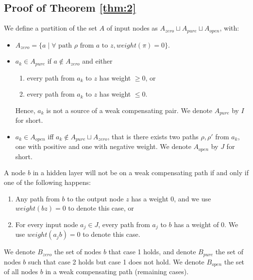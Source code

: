 			
			\subsection{Proof of Theorem \ref{thm:2}}
			
			\begin{definition}
				We define a partition of the set $A$ of input nodes as $A_{zero} \sqcup A_{pure}\sqcup A_{open}$, with:  
				\begin{itemize}
					\item $A_{zero}= \{a \mid \forall \text{ path $\rho$ from $a$ to } z, weight(\pi)=0\}$.
	
					\item $a_k \in A_{pure}$  if $a \notin A_{zero}$ and either
					\begin{enumerate}
						\item every path from $a_k$ to $z$ has weight $\geq 0$, or
						\item every path from $a_k$ to $z$ has weight $\leq 0$. 
						
					\end{enumerate}
					Hence, $a_k$ is not a source of a weak compensating pair. We denote 
					$A_{pure}$ by $I$ for short.
					\item $a_k \in A_{open}$ iff $a_k \notin A_{pure} \sqcup A_{zero}$, that is there exists two paths $\rho,\rho'$ from $a_k$, one with positive and one with negative weight. 	We denote $A_{open}$ by $J$ for short.
				\end{itemize}
			\end{definition} 
			

			
			\begin{lemma} \label{lem:open_node_2}
				A node $b$ in a hidden layer will not be on a weak compensating path if and only if one of the following happens:
				\begin{enumerate}
					\item Any path from $b$ to the output node $z$ has a weight $0$, and we use $weight({bz})=0$ to denote this case, or
					\item For every input node $a_j\in J$, every path from $a_j$ to $b$ has a weight of $0$. We use $weight({a_jb})=0$ to denote this case.
				\end{enumerate}
				
			\end{lemma}
			
			We denote $B_{zero}$ the set of nodes $b$ that case 1 holds, and denote $B_{pure}$ the set of nodes $b$ such that case 2 holds but case 1 does not hold.
			We denote $B_{open}$ the set of all nodes $b$ in a weak compensating path (remaining cases).
			

